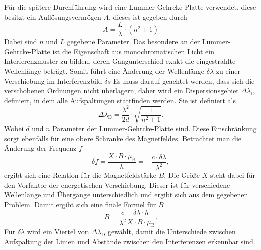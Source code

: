 Für die spätere Durchführung wird eine Lummer-Gehrcke-Platte verwendet, diese besitzt ein Auflösungsvermögen $A$, dieses ist gegeben durch 
\begin{equation}
    A = \frac{L}{\lambda} \cdot \left( n^2 + 1 \right)
   \label{eq:aufloesung}
\end{equation}
Dabei sind $n$ und $L$ gegebene Parameter.
Das besondere an der Lummer-Gehrcke-Platte ist die Eigenschaft aus monochromatischen Licht ein Interferenzmuster zu bilden, deren Gangunterschied exakt die eingestrahlte Wellenlänge beträgt.
Somit führt eine Änderung der Wellenlänge $\delta \lambda$ zu einer Verschiebung im Interferenzbild  $\delta s$
Es muss darauf geachtet werden, dass sich die verschobenen Ordnungen nicht überlagern, daher wird ein Dispersionsgebiet $\Delta \lambda _\text{D}$ definiert, in dem alle Aufspaltungen stattfinden werden. 
Sie ist definiert als 
\begin{equation}
    \Delta \lambda _\text{D} = \frac{\lambda ^2}{2 d} \cdot \sqrt{ \frac{1}{n^2 + 1}    }.
   \label{eq:dispers}
\end{equation}
Wobei $d$ und $n$ Parameter der Lummer-Gehrcke-Platte sind. 
Diese Einschränkung sorgt ebenfalls für eine obere Schranke des Magnetfeldes.
Betrachtet man die Änderung der Frequenz $f$
\begin{equation}
    \delta f = \frac{X \cdot B \cdot \mu _\text{B}}{h} = - \frac{c \cdot \delta \lambda}{\lambda ^2},
   \label{eq:freq}
\end{equation}
ergibt sich eine Relation für die Magnetfeldstärke $B$.
Die Größe $X$ steht dabei für den Vorfaktor der energetischen Verschiebung.
Dieser ist für verschiedene Wellenlänge und Übergänge unterschiedlich und ergibt sich aus dem gegebenen Problem. 
Damit ergibt sich eine finale Formel für $B$
\begin{equation}
    B =  \frac{c}{\lambda ^2} \frac{\delta \lambda \cdot h}{X \cdot B \cdot \mu _\text{B}}.
   \label{eq:bfeld}
\end{equation}
Für $\delta \lambda $ wird ein Viertel von $\Delta \lambda _\text{D}$ gewählt, damit die Unterschiede zwischen Aufspaltung der Linien und Abstände zwischen den Interferenzen erkennbar sind.